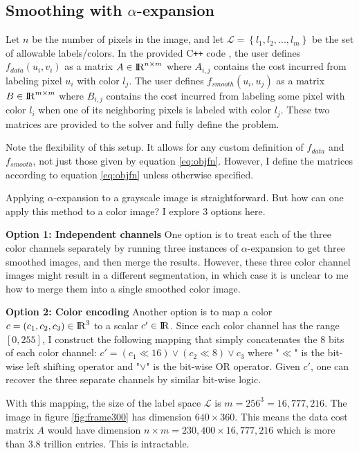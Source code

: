 \documentclass[10pt,twocolumn,letterpaper]{article}
\begin{document}
\subsection{Smoothing with $\alpha$-expansion}
Let $n$ be the number of pixels in the image, and let $\mathcal{L} = \left\lbrace l_1, l_2, ..., l_m \right\rbrace $ be the set of allowable labels/colors. In the provided C\texttt{++} code \cite{boykov2001fast, kolmogorov2004energy, boykov2004experimental}, the user defines $f_{data}(u_i, v_i)$ as a matrix $A \in {\rm I\!R}^{n \times m}$ where $A_{i,j}$ contains the cost incurred from labeling pixel $u_i$ with color $l_j$. The user defines $f_{smooth}(u_i, u_j)$ as a matrix $B \in {\rm I\!R}^{m \times m}$ where $B_{i, j}$ contains the cost incurred from labeling some pixel with color $l_i$ when one of its neighboring pixels is labeled with color $l_j$. These two matrices are provided to the solver and fully define the problem.

Note the flexibility of this setup. It allows for any custom definition of $f_{data}$ and $f_{smooth}$, not just those given by equation \ref{eq:objfn}. However, I define the matrices according to equation \ref{eq:objfn} unless otherwise specified.

Applying $\alpha$-expansion to a grayscale image is straightforward. But how can one apply this method to a color image? I explore 3 options here.

{\bf Option 1: Independent channels } One option is to treat each of the three color channels separately by running three instances of $\alpha$-expansion to get three smoothed images, and then merge the results. However, these three color channel images might result in a different segmentation, in which case it is unclear to me how to merge them into a single smoothed color image.

{\bf Option 2: Color encoding } Another option is to map a color $c = (c_1, c_2, c_3) \in {\rm I\!R}^3$ to a scalar $c' \in {\rm I\!R}$. Since each color channel has the range $[0, 255]$, I construct the following mapping that simply concatenates the 8 bits of each color channel: $c' = (c_1 \ll 16) \lor (c_2 \ll 8) \lor c_3$ where "$\ll$" is the bit-wise left shifting operator and "$\lor$" is the bit-wise OR operator. Given $c'$, one can recover the three separate channels by similar bit-wise logic.

With this mapping, the size of the label space $\mathcal{L}$ is $m = 256^3 = 16,777,216$. The image in figure \ref{fig:frame300} has dimension $640 \times 360$. This means the data cost matrix $A$ would have dimension $n \times m = 230,400 \times 16,777,216$ which is more than 3.8 trillion entries. This is intractable.
\end{document}
